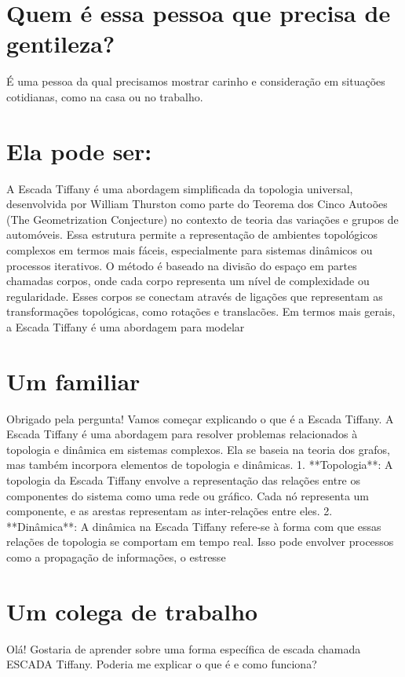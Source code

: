 \documentclass[11pt,a4paper]{article}
\begin{document}
\section{Quem é essa pessoa que precisa de gentileza?}
É uma pessoa da qual precisamos mostrar carinho e consideração em situações cotidianas, como na casa ou no trabalho.

\section{Ela pode ser:}
A Escada Tiffany é uma abordagem simplificada da topologia universal, desenvolvida por William Thurston como parte do Teorema dos Cinco Autoões (The Geometrization Conjecture) no contexto de teoria das variações e grupos de automóveis. Essa estrutura permite a representação de ambientes topológicos complexos em termos mais fáceis, especialmente para sistemas dinâmicos ou processos iterativos. O método é baseado na divisão do espaço em partes chamadas corpos, onde cada corpo representa um nível de complexidade ou regularidade. Esses corpos se conectam através de ligações que representam as transformações topológicas, como rotações e translacões. Em termos mais gerais, a Escada Tiffany é uma abordagem para modelar

\section{Um familiar}
Obrigado pela pergunta! Vamos começar explicando o que é a Escada Tiffany. A Escada Tiffany é uma abordagem para resolver problemas relacionados à topologia e dinâmica em sistemas complexos. Ela se baseia na teoria dos grafos, mas também incorpora elementos de topologia e dinâmicas. 1. **Topologia**: A topologia da Escada Tiffany envolve a representação das relações entre os componentes do sistema como uma rede ou gráfico. Cada nó representa um componente, e as arestas representam as inter-relações entre eles. 2. **Dinâmica**: A dinâmica na Escada Tiffany refere-se à forma com que essas relações de topologia se comportam em tempo real. Isso pode envolver processos como a propagação de informações, o estresse

\section{Um colega de trabalho}
Olá! Gostaria de aprender sobre uma forma específica de escada chamada ESCADA Tiffany. Poderia me explicar o que é e como funciona?
\end{document}
